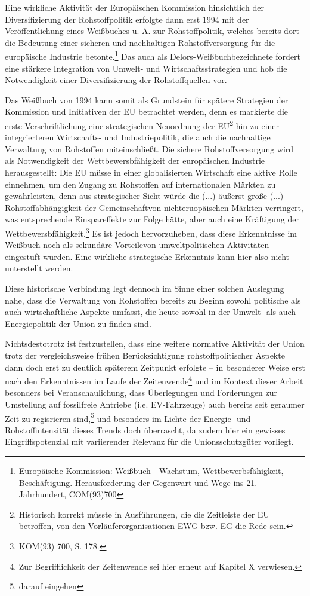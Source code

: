 \documentclass[12pt,a4paper,oneside]{book} %
\begin{document}
Eine wirkliche Aktivität der Europäischen Kommission hinsichtlich der Diversifizierung der Rohstoffpolitik erfolgte dann erst 1994 mit der Veröffentlichung eines Weißbuches u. A. zur Rohstoffpolitik, welches bereits dort die Bedeutung einer sicheren und nachhaltigen Rohstoffversorgung für die europäische Industrie betonte.\footnote{Europäische Kommission: Weißbuch - Wachstum, Wettbewerbsfähigkeit, Beschäftigung. Herausforderung der Gegenwart und Wege ins 21. Jahrhundert, COM(93)700}
Das auch als \glqq Delors-Weißbuch\grqq bezeichnete  fordert eine stärkere Integration von Umwelt- und Wirtschaftsstrategien und hob die Notwendigkeit einer Diversifizierung der Rohstoffquellen vor.
	
	
Das Weißbuch von 1994 kann somit als Grundstein für spätere Strategien der Kommission und Initiativen der EU betrachtet werden, denn es markierte die erste Verschriftlichung eine strategischen Neuordnung der EU\footnote{Historisch korrekt müsste in Ausführungen, die die Zeitleiste der EU betroffen, von den Vorläuferorganisationen EWG bzw. EG die Rede sein.} hin zu einer integrierteren Wirtschafts- und Industriepolitik, die auch die nachhaltige Verwaltung von Rohstoffen miteinschließt. Die sichere Rohstoffversorgung wird als Notwendigkeit der Wettbewersbfähigkeit der europäischen Industrie herausgestellt: Die EU müsse in einer globalisierten Wirtschaft eine aktive Rolle einnehmen, um den Zugang zu  Rohstoffen auf internationalen Märkten zu gewährleisten, denn aus strategischer Sicht würde die \glqq (...) äußerst große (...) Rohstoffabhängigkeit der Gemeinschaft\grqq von nichteruopäischen Märkten verringert, was entsprechende Einspareffekte zur Folge hätte, aber auch eine Kräftigung der Wettbewersbfähigkeit.\footnote{KOM(93) 700, S. 178.} Es ist jedoch hervorzuheben, dass diese Erkenntnisse im Weißbuch noch als \glqq sekundäre Vorteile\grqq von umweltpolitischen Aktivitäten eingestuft wurden. Eine wirkliche strategische Erkenntnis kann hier also nicht unterstellt werden.
	
Diese historische Verbindung legt dennoch im Sinne einer solchen Auslegung nahe, dass die Verwaltung von Rohstoffen bereits zu Beginn sowohl politische als auch wirtschaftliche Aspekte umfasst, die heute sowohl in der Umwelt- als auch Energiepolitik der Union zu finden sind.
	
Nichtsdestotrotz ist festzustellen, dass eine weitere normative Aktivität der Union trotz der vergleichsweise frühen Berücksichtigung rohstoffpolitischer Aspekte dann doch erst zu deutlich späterem Zeitpunkt erfolgte -- in besonderer Weise erst nach den Erkenntnissen im Laufe der Zeitenwende\footnote{Zur Begrifflichkeit der Zeitenwende sei hier erneut auf Kapitel X verwiesen.} und im Kontext dieser Arbeit besonders bei Veranschaulichung, dass Überlegungen und Forderungen zur Umstellung auf fossilfreie Antriebe (i.e. EV-Fahrzeuge) auch bereits seit geraumer Zeit zu regisrieren sind,\footnote{darauf eingehen} und besonders im Lichte der Energie- und Rohstoffintensität dieses Trends doch überrascht, da zudem hier ein gewisses Eingriffspotenzial mit variierender Relevanz für die Unionsschutzgüter vorliegt. 
	
\end{document}
